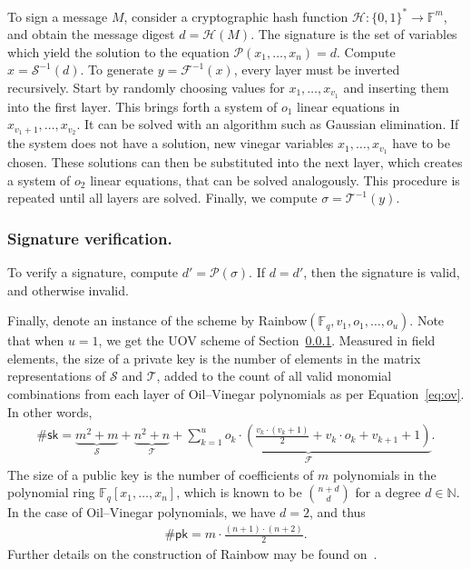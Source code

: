 \documentclass[draft, 12pt, a4paper, oneside]{memoir}
\theoremstyle{definition}
\begin{document}
To sign a message $M$, consider a cryptographic hash function
$\mathcal{H} : {\{0, 1\}}^{*} \to \mathbb{F}^{m}$, and obtain the
message digest $d = \mathcal{H}(M)$. The signature is the set of variables
which yield the solution to the equation
$\mathcal{P}(x_{1}, \dots, x_{n}) = d$. Compute $x = \mathcal{S}^{-1}(d)$. To
generate $y = \mathcal{F}^{-1}(x)$, every layer must be inverted recursively.
Start by randomly choosing values for $x_{1}, \dots, x_{v_{1}}$ and inserting
them into the first layer. This brings forth a system of $o_{1}$ linear
equations in $x_{v_{1} + 1}, \dots, x_{v_{2}}$. It can be solved with an
algorithm such as Gaussian elimination. If the system does not have a solution,
new vinegar variables $x_{1}, \dots, x_{v_{1}}$ have to be chosen. These solutions can then be
substituted into the next layer, which creates a system of $o_{2}$ linear
equations, that can be solved analogously. This procedure is repeated until all
layers are solved. Finally, we compute $\sigma = \mathcal{T}^{-1}(y)$.

\subsubsection{Signature verification.}

To verify a signature, compute $d' = \mathcal{P}(\sigma)$. If $d = d'$, then
the signature is valid, and otherwise invalid.

Finally, denote an instance of the scheme by Rainbow$(\mathbb{F}_{q}, v_{1}, o_{1}, \dots, o_{u})$. Note that when $u = 1$, we get the UOV scheme of Section~\ref{}. Measured in field elements, the size of a private key is the number of elements in the matrix representations of $\mathcal{S}$ and $\mathcal{T}$, added to the count of all valid monomial combinations from each layer of Oil--Vinegar polynomials as per Equation~\ref{eq:ov}. In other words,
\begin{align}
  \#\mathsf{sk} = \underbrace{m^{2} + m}_{\mathcal{S}} 
    + \underbrace{n^{2} + n}_{\mathcal{T}}
    + \underbrace{\sum_{k = 1}^{u} o_{k} \cdot \left( \frac{v_{k} \cdot (v_{k} + 1)}{2}
      + v_{k} \cdot o_{k} + v_{k + 1} + 1 \right)}_{\mathcal{F}}.
\end{align}
The size of a public key is the number of coefficients of $m$ polynomials in the polynomial ring $\mathbb{F}_{q}[x_{1}, \dots, x_{n}]$, which is known to be $\binom{n + d}{d}$ for a degree $d \in \mathbb{N}$. In the case of Oil--Vinegar polynomials, we have $d = 2$, and thus
\begin{align}
  \#\mathsf{pk} = m \cdot \frac{(n + 1) \cdot (n + 2)}{2}.
\end{align}
Further details on the construction of Rainbow may be found
on~\cite[Section 3.3]{Ding:2006}.
\end{document}
